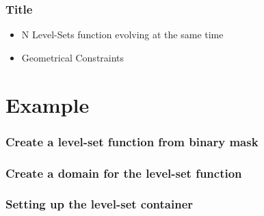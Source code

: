 
\begin{frame}
\frametitle{Title}
  \begin{itemize}
    \item N Level-Sets function evolving at the same time
    \item Geometrical Constraints
  \end{itemize}
\end{frame}

\section{Example}

\begin{frame}
  \frametitle{Create a level-set function from binary mask}
\end{frame}


\begin{frame}
  \frametitle{Create a domain for the level-set function}
\end{frame}


\begin{frame}
  \frametitle{Setting up the level-set container}
\end{frame}

